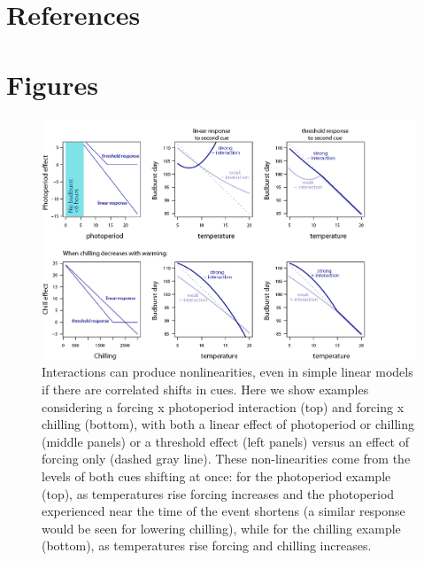 \documentclass[11pt,letter]{article}
\begin{document}
\clearpage

\section{References}


\clearpage

\section{Figures}

\clearpage
\begin{figure}
\centering
\includegraphics[width=1\textwidth]{figures/intxnsims2021photoaltwithchill_2cols.png}
\caption{Interactions can produce nonlinearities, even in simple linear models if there are correlated shifts in cues. Here we show examples considering a forcing x photoperiod interaction (top) and forcing x chilling (bottom), with both a linear effect of photoperiod or chilling (middle panels) or a threshold effect (left panels) versus an effect of forcing only (dashed gray line). These non-linearities come from the levels of both cues shifting at once: for the photoperiod example (top), as temperatures rise forcing increases and the photoperiod experienced near the time of the event shortens (a similar response would be seen for lowering chilling), while for the chilling example (bottom), as temperatures rise forcing and chilling increases.}
  \label{fig:intxncues}
\end{figure}
\end{document}
